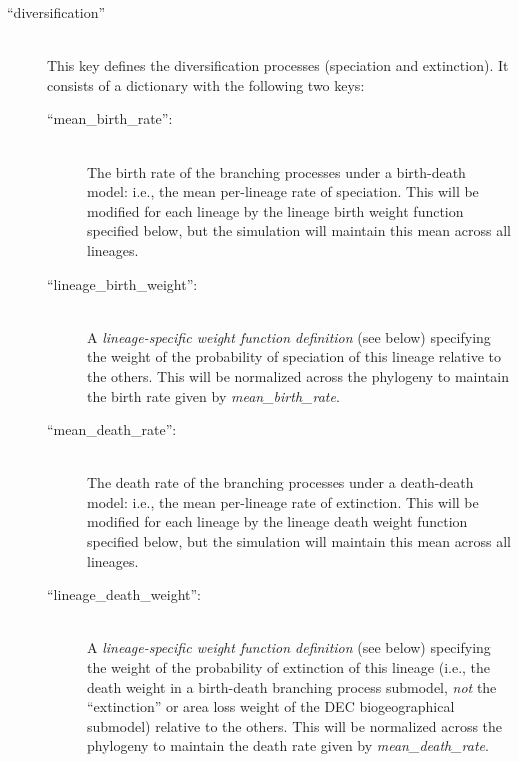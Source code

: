 \documentclass[11pt,openany]{memoir} %
\begin{document}
\begin{description}
    \item[``diversification'']  \hfill \\
        This key defines the diversification processes (speciation and extinction).
        It consists of a dictionary with the following two keys:
        \begin{description}
            \item[``mean\_birth\_rate'':] \hfill \\
                The birth rate of the branching processes under a birth-death model: i.e., the mean per-lineage rate of speciation. This will be modified for each lineage by the lineage birth weight function specified below, but the simulation will maintain this mean across all lineages.
            \item[``lineage\_birth\_weight'':] \hfill \\
                A \textit{lineage-specific weight function definition} (see below) specifying the weight of the probability of speciation of this lineage relative to the others.
                This will be normalized across the phylogeny to maintain the birth rate given by \textit{mean\_birth\_rate}.
            \item[``mean\_death\_rate'':] \hfill \\
                The death rate of the branching processes under a death-death model: i.e., the mean per-lineage rate of extinction. This will be modified for each lineage by the lineage death weight function specified below, but the simulation will maintain this mean across all lineages.
            \item[``lineage\_death\_weight'':] \hfill \\
                A \textit{lineage-specific weight function definition} (see below) specifying the weight of the probability of extinction of this lineage (i.e., the death weight in a birth-death branching process submodel, \textit{not} the ``extinction'' or area loss weight of the DEC biogeographical submodel) relative to the others.
                This will be normalized across the phylogeny to maintain the death rate given by \textit{mean\_death\_rate}.
        \end{description}


\end{description}
\end{document}
